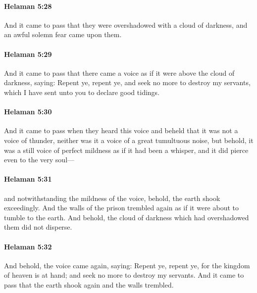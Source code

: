 		\paragraph{Helaman 5:28} %
			\label{HELAMAN-5-28}

			And it came to pass that they were overshadowed with a cloud of darkness,
			and an awful solemn fear came upon them.

		\paragraph{Helaman 5:29} %
			\label{HELAMAN-5-29}

			And it came to pass that there came a voice
			as if it were above the cloud of darkness, saying:
			Repent ye, repent ye,
			and seek no more to destroy my servants,
			which I have sent unto you to declare good tidings.

		\paragraph{Helaman 5:30} %
			\label{HELAMAN-5-30}

			And it came to pass when they heard this voice
			and beheld that it was not a voice of thunder,
			neither was it a voice of a great tumultuous noise,
			but behold, it was a still voice of perfect mildness
			as if it had been a whisper,
			and it did pierce even to the very soul---

		\paragraph{Helaman 5:31} %
			\label{HELAMAN-5-31}

			and notwithstanding the mildness of the voice,
			behold, the earth shook exceedingly.
			And the walls of the prison trembled again
			as if it were about to tumble to the earth.
			And behold, the cloud of darkness which had overshadowed them did not disperse.

		\paragraph{Helaman 5:32} %
			\label{HELAMAN-5-32}

			And behold, the voice came again, saying:
			Repent ye, repent ye,
			for the kingdom of heaven is at hand;
			and seek no more to destroy my servants.
			And it came to pass that the earth shook again and the walls trembled.

